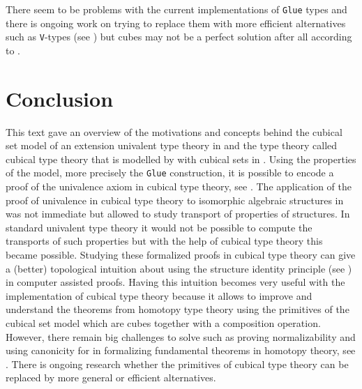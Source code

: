 \documentclass[12pt,a4paper,twoside,xetex]{book} %
\begin{document}
 There seem to be problems with 
the current implementations of \texttt{Glue} types and there is ongoing work on 
trying to replace them with more efficient alternatives such as 
\texttt{V}-types (see ) but cubes may not be a perfect solution after all
according to \cite{Cubicalv92:online}.

% 






\chapter*{Conclusion}

This text gave an overview of the motivations and concepts behind the cubical 
set model of an extension univalent type theory in  and the type 
theory called cubical type theory that is modelled by with cubical sets in 
. Using the properties of the model, more precisely the 
\texttt{Glue} construction, it is possible to encode a proof of the univalence 
axiom in cubical type theory, see . The application of the 
proof of univalence in cubical type theory to isomorphic algebraic structures in 
 was not immediate but allowed to study transport of properties of 
structures. In standard univalent type theory it would not be possible to 
compute the transports of such properties but with the help of cubical type 
theory this became possible. Studying these formalized proofs in cubical type 
theory can give a (better) topological intuition about using the structure 
identity principle (see \cite{Aczel2012}) in computer assisted proofs. Having 
this intuition becomes very useful with the implementation of cubical type 
theory because it allows to improve and understand the theorems from homotopy 
type theory using the primitives of the cubical set model which are 
cubes together with a composition operation. However, there remain big challenges to solve such as proving normalizability and 
using canonicity for in formalizing fundamental theorems in homotopy theory, see 
. There is ongoing research whether the primitives of cubical 
type theory can be replaced by more general or efficient alternatives.
\end{document}
